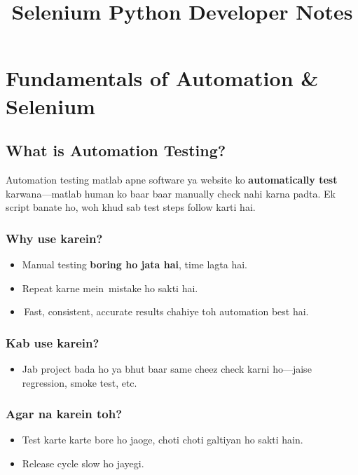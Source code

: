 \documentclass[a4paper,12pt]{article}
\newcommand{\mostimportant}[1]{\textbf{\color{importantred}#1}}
\newcommand{\concept}[1]{\textcolor{conceptgreen}{#1}}
\newcommand{\checkmarkinline}{\textcolor{green}{\ding{51}}\,} %
\newcommand{\crossmarkinline}{\textcolor{red}{\ding{55}}\,}  %
\begin{document}
\title{\textcolor{sectionblue}{\textbf{Selenium Python Developer Notes}}}
\author{}
\date{}

\maketitle

\section{Fundamentals of Automation \& Selenium}

\subsection{What is Automation Testing?}
Automation testing matlab apne software ya website ko \textbf{automatically test} karwana—matlab human ko baar baar manually check nahi karna padta. Ek script banate ho, woh khud sab test steps follow karti hai.

\subsubsection*{Why use karein?}
\begin{itemize}[leftmargin=*]
  \item Manual testing \mostimportant{boring ho jata hai}, time lagta hai.
  \item Repeat karne mein \crossmarkinline mistake ho sakti hai.
  \item \checkmarkinline Fast, consistent, accurate results chahiye toh \concept{automation best hai}.
\end{itemize}

\subsubsection*{Kab use karein?}
\begin{itemize}[leftmargin=*]
  \item Jab project bada ho ya bhut baar same cheez check karni ho—jaise regression, smoke test, etc.
\end{itemize}

\subsubsection*{Agar na karein toh?}
\begin{itemize}[leftmargin=*]
  \item Test karte karte bore ho jaoge, choti choti galtiyan ho sakti hain.
  \item Release cycle slow ho jayegi.
\end{itemize}
\end{document}
